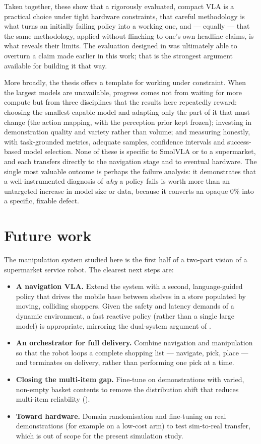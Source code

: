 Taken together, these show that a rigorously evaluated, compact VLA is a practical
choice under tight hardware constraints, that careful methodology is what turns an
initially failing policy into a working one, and --- equally --- that the same
methodology, applied without flinching to one's own headline claims, is what reveals
their limits. The evaluation designed in  was ultimately
able to overturn a claim made earlier in this work; that is the strongest argument
available for building it that way.

More broadly, the thesis offers a template for working under constraint. When the
largest models are unavailable, progress comes not from waiting for more compute but
from three disciplines that the results here repeatedly reward: choosing the
smallest capable model and adapting only the part of it that must change (the action
mapping, with the perception prior kept frozen); investing in demonstration quality
and variety rather than volume; and measuring honestly, with task-grounded metrics,
adequate samples, confidence intervals and success-based model selection. None of
these is specific to SmolVLA or to a supermarket, and each transfers directly to the
navigation stage and to eventual hardware. The single most valuable outcome is
perhaps the failure analysis: it demonstrates that a well-instrumented diagnosis of
\emph{why} a policy fails is worth more than an untargeted increase in model size or
data, because it converts an opaque 0\% into a specific, fixable defect.

\section{Future work}
\label{sec:future}
The manipulation system studied here is the first half of a two-part vision of a
supermarket service robot. The clearest next steps are:
\begin{itemize}
    \item \textbf{A navigation VLA.} Extend the system with a second,
    language-guided policy that drives the mobile base between shelves in a store
    populated by moving, colliding shoppers. Given the safety and latency demands of
    a dynamic environment, a fast reactive policy (rather than a single large model)
    is appropriate, mirroring the dual-system argument of
    .
    \item \textbf{An orchestrator for full delivery.} Combine navigation and
    manipulation so that the robot loops a complete shopping list --- navigate, pick,
    place --- and terminates on delivery, rather than performing one pick at a time.
    \item \textbf{Closing the multi-item gap.} Fine-tune on demonstrations with
    varied, non-empty basket contents to remove the distribution shift that reduces
    multi-item reliability ().
    \item \textbf{Toward hardware.} Domain randomisation and fine-tuning on real
    demonstrations (for example on a low-cost arm) to test sim-to-real transfer,
    which is out of scope for the present simulation study.
\end{itemize}


